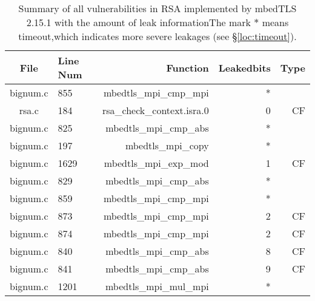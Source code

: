 \begin{table}%
\centering\tiny
\caption{Summary of all vulnerabilities in RSA implemented by mbedTLS 2.15.1 with the amount of leak informationThe mark $*$ means timeout,which indicates more severe leakages (see \S\ref{loc:timeout}).}\label{tab:RSAmbedTLS}
\begin{tabular}{clrrr}
\hline
\textbf{File} & \textbf{Line Num} & \textbf{Function} & \textbf{Leakedbits} & \textbf{Type} \\\hline
bignum.c& 855&mbedtls\_mpi\_cmp\_mpi&*&\\
rsa.c& 184&rsa\_check\_context.isra.0&0 &CF\\
bignum.c& 825&mbedtls\_mpi\_cmp\_abs&*&\\
bignum.c& 197&mbedtls\_mpi\_copy&*&\\
bignum.c& 1629&mbedtls\_mpi\_exp\_mod&1 &CF\\
bignum.c& 829&mbedtls\_mpi\_cmp\_abs&*&\\
bignum.c& 859&mbedtls\_mpi\_cmp\_mpi&*&\\
bignum.c& 873&mbedtls\_mpi\_cmp\_mpi&2 &CF\\
bignum.c& 874&mbedtls\_mpi\_cmp\_mpi&2 &CF\\
bignum.c& 840&mbedtls\_mpi\_cmp\_abs&8 &CF\\
bignum.c& 841&mbedtls\_mpi\_cmp\_abs&9 &CF\\
bignum.c& 1201&mbedtls\_mpi\_mul\_mpi&*&\\
\hline
\end{tabular}
\end{table}